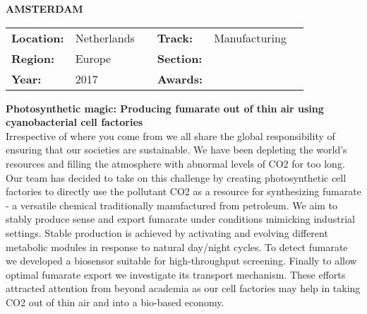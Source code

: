 \textbf{\uppercase{Amsterdam}} \FloatBarrier \begin{table}[h] \begin{tabular}{lp{2.5cm}llll} \textbf{Location:} & Netherlands & \multicolumn{1}{|l}{} & \textbf{Track:}   & Manufacturing \\ \textbf{Region:}   & Europe   & \multicolumn{1}{|l}{} & \textbf{Section:} &  \\ \textbf{Year:}     & 2017   & \multicolumn{1}{|l}{} & \textbf{Awards:}  & \end{tabular} \end{table} \FloatBarrier \noindent\textbf{Photosynthetic magic: Producing fumarate out of thin air using cyanobacterial cell factories} \vspace{.2cm}\\ 
Irrespective of where you come from we all share the global responsibility of ensuring that our societies are sustainable. We have been depleting the world’s resources and filling the atmosphere with abnormal levels of CO2 for too long. Our team has decided to take on this challenge by creating photosynthetic cell factories to directly use the pollutant CO2 as a resource for synthesizing fumarate - a versatile chemical traditionally manufactured from petroleum. We aim to stably produce sense and export fumarate under conditions mimicking industrial settings. Stable production is achieved by activating and evolving different metabolic modules in response to natural day/night cycles. To detect fumarate we developed a biosensor suitable for high-throughput screening. Finally to allow optimal fumarate export we investigate its transport mechanism. These efforts attracted attention from beyond academia as our cell factories may help in taking CO2 out of thin air and into a bio-based economy.
\vspace{2cm}

